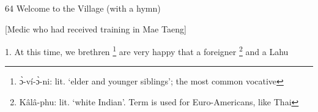 
64 Welcome to the Village (with a hymn)

[Medic who had received training in Mae Taeng]

1. At this time, we brethren \footnote{ɔ̀-ví-ɔ̀-ni: lit. `elder and younger siblings'; the most common vocative} are very happy that a foreigner \footnote{Kâlâ-phu: lit. `white Indian'. Term is used for Euro-Americans, like Thai} and a Lahu
